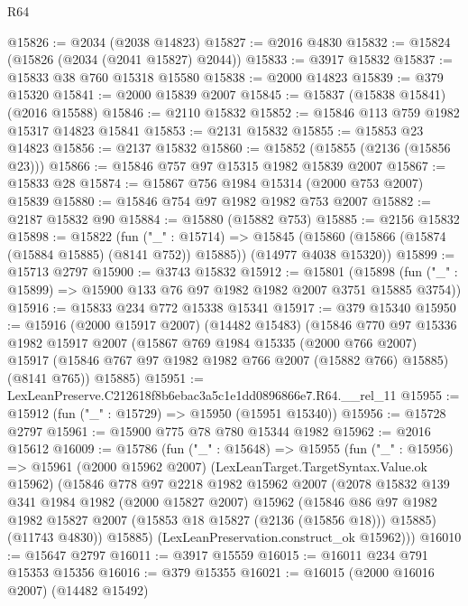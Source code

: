 \begin{lexlean}{R64}
\begin{coremodule}
@15826 := @2034 (@2038 @14823)
@15827 := @2016 @4830
@15832 := @15824 (@15826 (@2034 (@2041 @15827) @2044))
@15833 := @3917 @15832
@15837 := @15833 @38 @760 @15318 @15580
@15838 := @2000 @14823
@15839 := @379 @15320
@15841 := @2000 @15839 @2007
@15845 := @15837 (@15838 @15841) (@2016 @15588)
@15846 := @2110 @15832
@15852 := @15846 @113 @759 @1982 @15317 @14823 @15841
@15853 := @2131 @15832
@15855 := @15853 @23 @14823
@15856 := @2137 @15832
@15860 := @15852 (@15855 (@2136 (@15856 @23)))
@15866 := @15846 @757 @97 @15315 @1982 @15839 @2007
@15867 := @15833 @28
@15874 := @15867 @756 @1984 @15314 (@2000 @753 @2007) @15839
@15880 := @15846 @754 @97 @1982 @1982 @753 @2007
@15882 := @2187 @15832 @90
@15884 := @15880 (@15882 @753)
@15885 := @2156 @15832
@15898 := @15822
    (fun ("_" : @15714) =>
    @15845 (@15860 (@15866 (@15874 (@15884 @15885) (@8141 @752)) @15885)) (@14977 @4038 @15320))
@15899 := @15713 @2797
@15900 := @3743 @15832
@15912 := @15801
    (@15898 (fun ("_" : @15899) => @15900 @133 @76 @97 @1982 @1982 @2007 @3751 @15885 @3754))
@15916 := @15833 @234 @772 @15338 @15341
@15917 := @379 @15340
@15950 := @15916
    (@2000 @15917 @2007)
    (@14482 @15483)
    (@15846
      @770
      @97
      @15336
      @1982
      @15917
      @2007
      (@15867
        @769
        @1984
        @15335
        (@2000 @766 @2007)
        @15917
        (@15846 @767 @97 @1982 @1982 @766 @2007 (@15882 @766) @15885)
        (@8141 @765))
      @15885)
@15951 := LexLeanPreserve.C212618f8b6ebac3a5c1e1dd0896866e7.R64.__rel_11
@15955 := @15912 (fun ("_" : @15729) => @15950 (@15951 @15340))
@15956 := @15728 @2797
@15961 := @15900 @775 @78 @780 @15344 @1982
@15962 := @2016 @15612
@16009 := @15786
    (fun ("_" : @15648) =>
    @15955
      (fun ("_" : @15956) =>
      @15961
        (@2000 @15962 @2007)
        (LexLeanTarget.TargetSyntax.Value.ok @15962)
        (@15846
          @778
          @97
          @2218
          @1982
          @15962
          @2007
          (@2078
            @15832
            @139
            @341
            @1984
            @1982
            (@2000 @15827 @2007)
            @15962
            (@15846
              @86
              @97
              @1982
              @1982
              @15827
              @2007
              (@15853 @18 @15827 (@2136 (@15856 @18)))
              @15885)
            (@11743 @4830))
          @15885)
        (LexLeanPreservation.construct_ok @15962)))
@16010 := @15647 @2797
@16011 := @3917 @15559
@16015 := @16011 @234 @791 @15353 @15356
@16016 := @379 @15355
@16021 := @16015 (@2000 @16016 @2007) (@14482 @15492)

\end{coremodule}
\end{lexlean}
